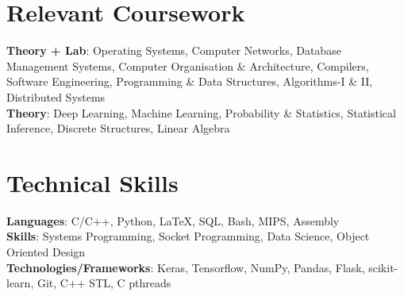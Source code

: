 \documentclass[letterpaper]{article}
\begin{document}
\section{Relevant Coursework}
    \begin{itemize}[leftmargin=0.15in, label={}]
      \small{\item{
        \textbf{Theory + Lab}{: Operating Systems, Computer Networks, Database Management Systems, Computer Organisation \& Architecture, Compilers, Software Engineering, Programming \& Data Structures, Algorithms-I \& II, Distributed Systems} \\
        \textbf{Theory}{: Deep Learning, Machine Learning, Probability \& Statistics, Statistical Inference, Discrete Structures, Linear Algebra} \\
      }}
    \end{itemize}
  \vspace{-10pt}


%
\section{Technical Skills}
 \begin{itemize}[leftmargin=0.15in, label={}]
    \small{\item{
     \textbf{Languages}{: C/C++, Python, LaTeX, SQL, Bash, MIPS, Assembly} \\
     \textbf{Skills}{: Systems Programming, Socket Programming, Data Science, Object Oriented Design} \\
     \textbf{Technologies/Frameworks}{: Keras, Tensorflow, NumPy, Pandas, Flask, scikit-learn, Git, C++ STL, C pthreads} \\
    }}
 \end{itemize}
 \vspace{-10pt}
\end{document}

